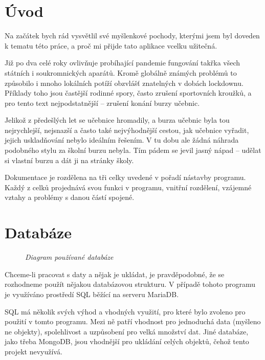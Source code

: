 \documentclass[a4paper,oneside,12pt]{report}
\begin{document}


\tableofcontents

\chapter*{Úvod}
Na začátek bych rád vysvětlil své myšlenkové pochody, kterými jsem byl doveden k tematu
této práce, a proč mi přijde tato aplikace vcelku užitečná.

Již po dva celé roky ovlivňuje probíhající pandemie fungování takřka všech státních i
soukromnických aparátů. Kromě globálně známých problémů to způsobilo i mnoho lokálních
potíží obzvlášť znatelných v dobách lockdownu. Příklady toho jsou častější rodinné spory,
často zrušení sportovních kroužků, a pro tento text nejpodstatnější -- zrušení konání
burzy učebnic.

Jelikož z předešlých let se učebnice hromadily, a burza učebnic byla tou nejrychlejší,
nejsnazší a často také nejvýhodnější cestou, jak učebnice vyřadit, jejich uskladňování
nebylo ideálním řešením. V tu dobu ale žádná náhrada podobného stylu za školní burzu
nebyla. Tím pádem se jevil jasný nápad -- udělat si vlastní burzu a dát ji na stránky
školy.

\vspace{1em}
Dokumentace je rozdělena na tři celky uvedené v pořadí nástavby programu. Každý z celků
projednává svou funkci v programu, vnitřní rozdělení, vzájemné vztahy a problémy s danou
částí spojené.


\chapter{Databáze}
\begin{figure}
	\vspace{-2.5mm}
	\def\svgwidth{\columnwidth}\scalebox{0.5}{}
	\caption{\textit{Diagram používané databáze}}\label{fig:ER_Diagram}
\end{figure}

Chceme-li pracovat s daty a nějak je ukládat, je pravděpodobné, že se rozhodneme použít
nějakou databázovou strukturu. V případě tohoto programu je využíváno prostředí SQL běžící
na serveru MariaDB.

SQL má několik svých výhod a vhodných využití, pro které bylo zvoleno pro použití v tomto
programu. Mezi ně patří vhodnost pro jednoduchá data (myšleno ne objekty), spolehlivost a
uzpůsobení pro velká množství dat. Jiné databáze, jako třeba MongoDB, jsou vhodnější pro
ukládání celých objektů, čehož tento projekt nevyužívá.
\end{document}
